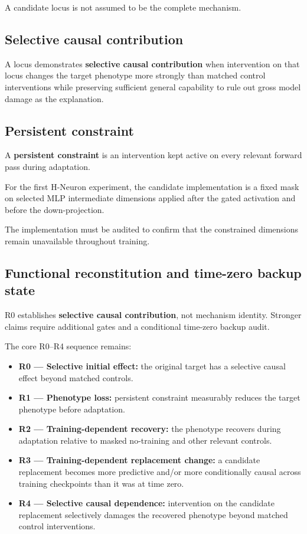 A candidate locus is not assumed to be the complete mechanism.

\subsection{Selective causal contribution}\label{selective-causal-contribution}

A locus demonstrates \textbf{selective causal contribution} when intervention on that locus changes the target phenotype more strongly than matched control interventions while preserving sufficient general capability to rule out gross model damage as the explanation.

\subsection{Persistent constraint}\label{persistent-constraint}

A \textbf{persistent constraint} is an intervention kept active on every relevant forward pass during adaptation.

For the first H-Neuron experiment, the candidate implementation is a fixed mask on selected MLP intermediate dimensions applied after the gated activation and before the down-projection.

The implementation must be audited to confirm that the constrained dimensions remain unavailable throughout training.

\subsection{Functional reconstitution and time-zero backup state}\label{functional-reconstitution}

R0 establishes \textbf{selective causal contribution}, not mechanism identity. Stronger claims require additional gates and a conditional time-zero backup audit.

The core R0--R4 sequence remains:

\begin{itemize}
\tightlist
\item \textbf{R0 --- Selective initial effect:} the original target has a selective causal effect beyond matched controls.
\item \textbf{R1 --- Phenotype loss:} persistent constraint measurably reduces the target phenotype before adaptation.
\item \textbf{R2 --- Training-dependent recovery:} the phenotype recovers during adaptation relative to masked no-training and other relevant controls.
\item \textbf{R3 --- Training-dependent replacement change:} a candidate replacement becomes more predictive and/or more conditionally causal across training checkpoints than it was at time zero.
\item \textbf{R4 --- Selective causal dependence:} intervention on the candidate replacement selectively damages the recovered phenotype beyond matched control interventions.
\end{itemize}

